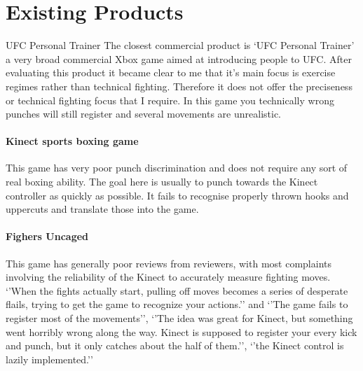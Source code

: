 \section{Existing Products}
\par{UFC Personal Trainer}
The closest commercial product is `UFC Personal Trainer' a very broad commercial Xbox game aimed at introducing people to UFC. After evaluating this product it became clear to me that it’s main focus is  exercise regimes rather than technical fighting. Therefore it does not offer the preciseness or technical fighting focus that I require. In this game you technically wrong punches will still register and several movements are unrealistic.

\paragraph{Kinect sports boxing game}
This game has very poor punch discrimination and does not require any sort of real boxing ability. The goal here is usually to punch towards the Kinect controller as quickly as possible. It fails to recognise properly thrown hooks and uppercuts and translate those into the game. 

\paragraph{Fighers Uncaged}
This game has generally poor reviews from reviewers, with most complaints involving the reliability of the Kinect to accurately measure fighting moves. \cite{gamerev1} `'When the fights actually start, pulling off moves becomes a series of desperate flails, trying to get the game to recognize your actions.''\cite{gamerev2} 
and `'The game fails to register most of the movements'', `'The idea was great for Kinect, but something went horribly wrong along the way. Kinect is supposed to register your every kick and punch, but it only catches about the half of them.'', `'the Kinect control is lazily implemented.''\cite{gamerev3} \newline

